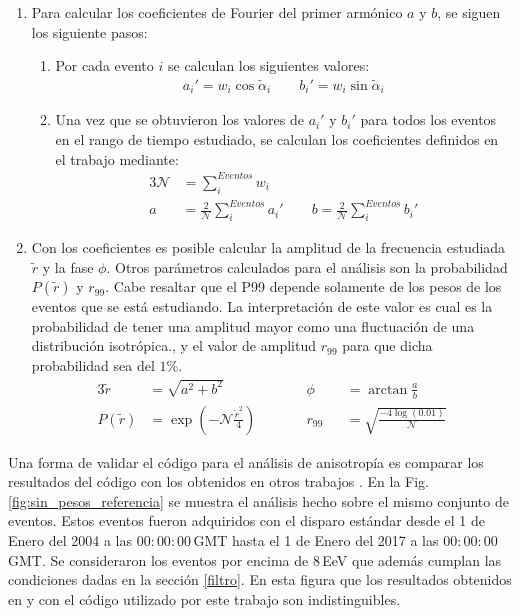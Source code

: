 \begin{enumerate}
        \item Para calcular los coeficientes de Fourier del primer armónico $a$ y $b$, se siguen los siguiente pasos:
        \begin{enumerate}
          \item Por cada evento  $i$ se calculan los siguientes valores:
          \begin{align}
             a_i' = {w_i}\cos\tilde{\alpha}_i \qquad
             b_i' = {w_i}\sin\tilde{\alpha}_i
         \end{align}
         \item Una vez que se obtuvieron los valores de $a_i'$ y $b_i'$ para todos los eventos en el rango de tiempo estudiado, se calculan los coeficientes definidos en el trabajo \cite{analisis_fourier} mediante:
         \begin{alignat}{3}
          \mathcal{N} &= \sum^{Eventos}_i w_i \\
            a &= \frac{2}{\mathcal{N}} \sum^{Eventos}_i a_i' \qquad
            b = \frac{2}{\mathcal{N}} \sum^{Eventos}_i b_i'  
         \end{alignat}
        \end{enumerate}
        \item Con los coeficientes es posible calcular la amplitud de la frecuencia estudiada $\tilde{r}$ y la fase $\phi$. Otros parámetros calculados para el análisis son la probabilidad $P(\tilde{r})$  y $r_{99}$. Cabe resaltar que el P99 depende solamente de los pesos de los eventos que se está estudiando. La interpretación  de este valor es cual es la probabilidad de tener una amplitud mayor como una fluctuación de una distribución isotrópica., y el valor de amplitud $r_{99}$ para que dicha probabilidad sea del $1$\%. 
        \begin{alignat}{3}
            \tilde{r} &= \sqrt{a^2 +b^2}                        \qquad &&   \phi&&= \arctan\frac{a}{b}\\
          P(\tilde{r})&= \exp(-\mathcal{N}\frac{\tilde{r}^2}{4})\qquad &&   r_{99}&&= \sqrt{\frac{-4\log(0.01)}{\mathcal{N}}}
        \end{alignat}

      \end{enumerate}

    Una forma de validar el código para el análisis de anisotropía es comparar los resultados del código con los obtenidos en otros trabajos \cite{taborda}. En la Fig.\ref{fig:sin_pesos_referencia} se muestra el análisis hecho sobre el mismo conjunto de eventos. Estos eventos fueron adquiridos con el disparo estándar desde el 1 de Enero del 2004 a las $00:00:00\,$GMT  hasta el 1 de Enero del 2017 a las $00:00:00\,$GMT. Se consideraron los eventos por encima de $8\,$EeV que además cumplan las condiciones dadas en la sección \ref{filtro}.  En esta figura que los resultados obtenidos en \cite{taborda} y con el código utilizado por este trabajo son indistinguibles. 

